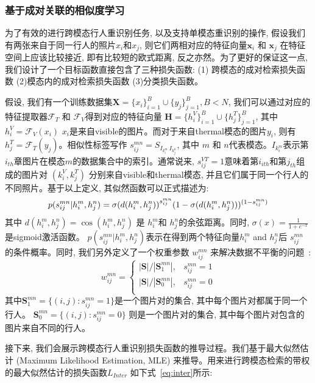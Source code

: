 \subsubsection{基于成对关联的相似度学习}
为了有效的进行跨模态行人重识别任务, 以及支持单模态重识别的操作, 假设我们有两张来自于同一行人的照片$x_i$和$x_j$, 则它们两相对应的特征向量$\mathbf{x}_i$ 和 $\mathbf{x}_j$ 在特征空间上应该比较接近, 即有比较短的欧式距离, 反之亦然。为了更好的保证这一点, 我们设计了一个目标函数直接包含了三种损失函数: (1) 跨模态的成对检索损失函数 (2)模态内的成对检索损失函数 (3)分类损失函数。\par
假设, 我们有一个训练数据集$\mathbf{X}= \{x_i\}^B_{i=1}\cup\{y_j\}^B_{j=1}, B < N$, 我们可以通过对应的特征提取器$\mathcal{F}_T$ 和  $\mathcal{F}_V$得到对应的特征向量 $\mathbf{H} = \{h_i^V\}_{i=1}^B\cup\{h_j^T\}^B_{j=1}$, 其中 $h_i^V = \mathcal{F}_V(x_i)$ $x_i$是来自visible的图片。而对于来自thermal模态的图片$y_i$, 则有 $h_j^T = \mathcal{F}_T(y_j)$。相似性标签写作 $s^{mn}_{ij} = S_{I_{k_i^m}~I_{k_j^n}}$, 其中 $m$ 和 $n$代表模态。$I_{k^m_i}$表示第$i_{th}$章图片在模态$m$的数据集合中的索引。通常说来, $s^{VT}_{ij}=1$意味着第$i_{ith}$和第$j_{th}$组成的图片对 $(k^V_i,k^T_j)$ 分别来自visible和thermal模态, 并且它们属于同一个行人的不同照片。基于以上定义, 其似然函数可以正式描述为:
\begin{equation}
  p(s^{mn}_{ij}|h_i^m,h_j^n) = \sigma{(d(h_i^m,h_j^n))}^{s^{mn}_{ij}}(1 - \sigma{(d(h_i^m,h_j^n))})^{(1-s^{mn}_{ij})} \label{con:conditional} \\
\end{equation}
其中 $d(h_i^m,h_j^n) = \cos{(h_i^m,h_j^n)}$ 是 $h_i^m$和 $h_j^n$的余弦距离。同时, $\sigma(x) = \frac{1}{1+e^{-x}}$ 是sigmoid激活函数。 $ p(s^{mn}_{ij}|h_i^m,h_j^n)$表示在得到两个特征向量$h_i^m$ and $h_j^n$后 $s^{mn}_{ij}$ 的条件概率。同时, 我们另外定义了一个权重参数 $w_{ij}^{mn}$ 来解决数据不平衡的问题~\cite{cao2018deep}:
\begin{equation}
  w^{mn}_{ij} = 
  \begin{cases}
  |\mathbf{S}|/|\mathbf{S}^{mn}_1|, &s^{mn}_{ij}=1\\
  |\mathbf{S}|/|\mathbf{S}^{mn}_0|, &s^{mn}_{ij}=0 \\
  \end{cases}
\end{equation}
其中$\mathbf{S}^{mn}_1 = \{(i,j): s^{mn}_{ij}=1\}$是一个图片对的集合, 其中每个图片对都属于同一个行人。 $\mathbf{S}^{mn}_0 = \{(i,j): s^{mn}_{ij}=0\}$ 则是一个图片对的集合, 其中每个图片对包含的图片来自不同的行人。\par
接下来, 我们会展示跨模态行人重识别损失函数的推导过程。我们基于最大似然估计 (Maximum Likelihood Estimation, MLE) 来推导。用来进行跨模态检索的带权的最大似然估计的损失函数$L_{Inter}$ 如下式~\ref{eq:inter}所示:
